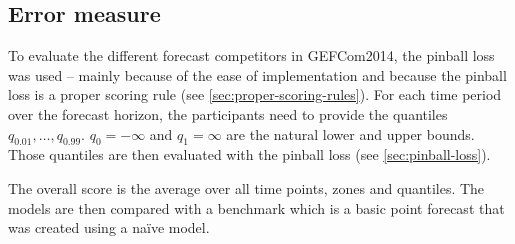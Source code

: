 \subsection{Error measure}

To evaluate the different forecast competitors in GEFCom2014, 
the pinball loss was used -- mainly because of the ease of implementation 
and because the pinball loss is a proper scoring rule (see \ref{sec:proper-scoring-rules}).
For each time period over the forecast horizon, the participants need to 
provide the quantiles \(q_{0.01}, \ldots, q_{0.99}\). 
\(q_0 = -\infty\) and \(q_1 = \infty\) are the natural lower and upper bounds. 
Those quantiles are then evaluated with the pinball loss (see \ref{sec:pinball-loss}).

The overall score is the average over all time points, zones and quantiles.
The models are then compared with a benchmark which is a basic point forecast 
that was created using a na\"{i}ve model.
